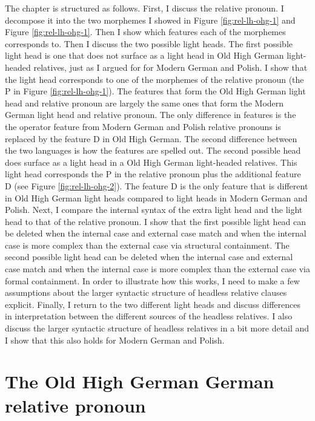The chapter is structured as follows.
First, I discuss the relative pronoun. I decompose it into the two morphemes I showed in Figure \ref{fig:rel-lh-ohg-1} and Figure \ref{fig:rel-lh-ohg-1}. Then I show which features each of the morphemes corresponds to.
Then I discuss the two possible light heads. The first possible light head is one that does not surface as a light head in Old High German light-headed relatives, just as I argued for for Modern German and Polish. I show that the light head corresponds to one of the morphemes of the relative pronoun (the P in Figure \ref{fig:rel-lh-ohg-1}).
The features that form the Old High German light head and relative pronoun are largely the same ones that form the Modern German light head and relative pronoun. The only difference in features is the the  operator feature from Modern German and Polish relative pronouns is replaced by the feature D in Old High German. The second difference between the two languages is how the features are spelled out.
The second possible head does surface as a light head in a Old High German light-headed relatives. This light head corresponds the P in the relative pronoun plus the additional feature D (see Figure \ref{fig:rel-lh-ohg-2}). The feature D is the only feature that is different in Old High German light heads compared to light heads in Modern German and Polish.
Next, I compare the internal syntax of the extra light head and the light head to that of the relative pronoun. I show that the first possible light head can be deleted when the internal case and external case match and when the internal case is more complex than the external case via structural containment. The second possible light head can be deleted when the internal case and external case match and when the internal case is more complex than the external case via formal containment. In order to illustrate how this works, I need to make a few assumptions about the larger syntactic structure of headless relative clauses explicit.
Finally, I return to the two different light heads and discuss differences in interpretation between the different sources of the headless relatives.
I also discuss the larger syntactic structure of headless relatives in a bit more detail and I show that this also holds for Modern German and Polish.


\section{The Old High German German relative pronoun}\label{sec:ohg-rel}

